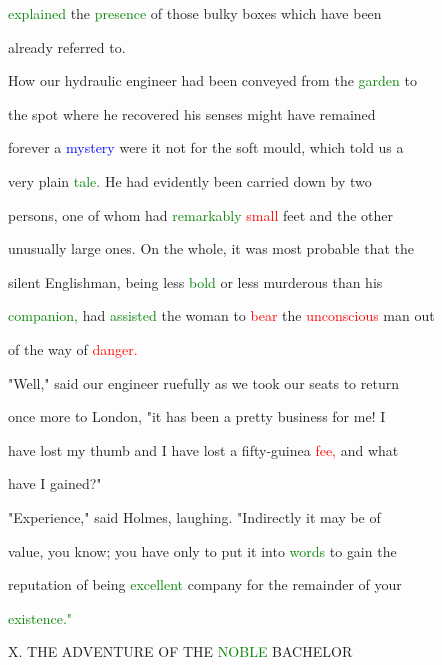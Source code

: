  \textcolor{green}{explained} the \textcolor{green}{presence} of those bulky boxes which have been

 already referred to.



 How our hydraulic engineer had been conveyed from the \textcolor{green}{garden} to

 the spot where he recovered his senses might have remained

 forever a \textcolor{blue}{mystery} were it not for the soft mould, which told us a

 very plain \textcolor{green}{tale.} He had evidently been carried down by two

 persons, one of whom had \textcolor{green}{remarkably} \textcolor{red}{small} feet and the other

 unusually large ones. On the whole, it was most probable that the

 silent Englishman, being less \textcolor{green}{bold} or less \textcolor{BurntOrange}{murderous} than his

 \textcolor{green}{companion,} had \textcolor{green}{assisted} the woman to \textcolor{red}{bear} the \textcolor{red}{unconscious} man out

 of the way of \textcolor{red}{danger.}



 "Well," said our engineer ruefully as we took our seats to return

 once more to London, "it has been a \textcolor{BurntOrange}{pretty} business for me! I

 have \textcolor{BurntOrange}{lost} my thumb and I have \textcolor{BurntOrange}{lost} a fifty-guinea \textcolor{red}{fee,} and what

 have I \textcolor{BurntOrange}{gained?"}



 "Experience," said Holmes, \textcolor{BurntOrange}{laughing.} "Indirectly it may be of

 value, you know; you have only to put it into \textcolor{green}{words} to \textcolor{BurntOrange}{gain} the

 reputation of being \textcolor{green}{excellent} company for the remainder of your

 \textcolor{green}{existence."}







 X. THE \textcolor{BurntOrange}{ADVENTURE} OF THE \textcolor{green}{NOBLE} BACHELOR



